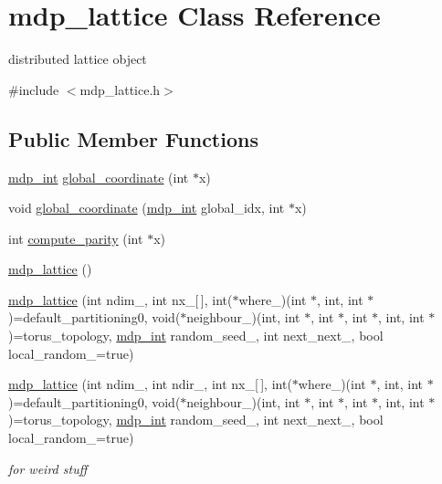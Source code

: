 \hypertarget{classmdp__lattice}{
\section{mdp\_\-lattice Class Reference}
\label{classmdp__lattice}
}


distributed lattice object  


{\ttfamily \#include $<$mdp\_\-lattice.h$>$}\subsection*{Public Member Functions}
\begin{DoxyCompactItemize}
\item 
\hyperlink{mdp__global__vars_8h_aaa1ad9d0dcd2124aa5af0120d9954174}{mdp\_\-int} \hyperlink{classmdp__lattice_a672142cb946fc501ad8ffc7c0ea01c42}{global\_\-coordinate} (int $\ast$x)
\item 
void \hyperlink{classmdp__lattice_af6928ac02766a006f82f6a87eef1019a}{global\_\-coordinate} (\hyperlink{mdp__global__vars_8h_aaa1ad9d0dcd2124aa5af0120d9954174}{mdp\_\-int} global\_\-idx, int $\ast$x)
\item 
int \hyperlink{classmdp__lattice_a3c949964a192c244a6f39df0aaceb1d2}{compute\_\-parity} (int $\ast$x)
\item 
\hyperlink{classmdp__lattice_a16771b478cc1e3a6bd70487de44e7a7a}{mdp\_\-lattice} ()
\item 
\hyperlink{classmdp__lattice_a90f0e67a6947ec2cab8065cef94d3ceb}{mdp\_\-lattice} (int ndim\_\-, int nx\_\-\mbox{[}$\,$\mbox{]}, int($\ast$where\_\-)(int $\ast$, int, int $\ast$)=default\_\-partitioning0, void($\ast$neighbour\_\-)(int, int $\ast$, int $\ast$, int $\ast$, int, int $\ast$)=torus\_\-topology, \hyperlink{mdp__global__vars_8h_aaa1ad9d0dcd2124aa5af0120d9954174}{mdp\_\-int} random\_\-seed\_, int next\_\-next\_, bool local\_\-random\_\-=true)
\item 
\hyperlink{classmdp__lattice_afe2d9427fc47225722c0ab3314246a88}{mdp\_\-lattice} (int ndim\_\-, int ndir\_\-, int nx\_\-\mbox{[}$\,$\mbox{]}, int($\ast$where\_\-)(int $\ast$, int, int $\ast$)=default\_\-partitioning0, void($\ast$neighbour\_\-)(int, int $\ast$, int $\ast$, int $\ast$, int, int $\ast$)=torus\_\-topology, \hyperlink{mdp__global__vars_8h_aaa1ad9d0dcd2124aa5af0120d9954174}{mdp\_\-int} random\_\-seed\_, int next\_\-next\_, bool local\_\-random\_\-=true)
\begin{DoxyCompactList}\small\item\em for weird stuff \item\end{DoxyCompactList}\item 

\end{DoxyCompactItemize}
